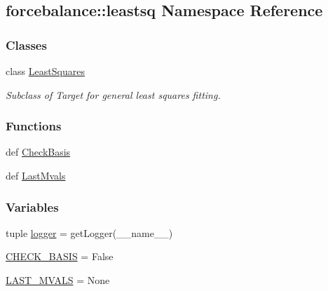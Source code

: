 \hypertarget{namespaceforcebalance_1_1leastsq}{\subsection{forcebalance\-:\-:leastsq \-Namespace \-Reference}
\label{namespaceforcebalance_1_1leastsq}
}
\subsubsection*{\-Classes}
\begin{DoxyCompactItemize}
\item 
class \hyperlink{classforcebalance_1_1leastsq_1_1LeastSquares}{\-Least\-Squares}
\begin{DoxyCompactList}\small\item\em \-Subclass of \-Target for general least squares fitting. \end{DoxyCompactList}\end{DoxyCompactItemize}
\subsubsection*{\-Functions}
\begin{DoxyCompactItemize}
\item 
def \hyperlink{namespaceforcebalance_1_1leastsq_a8e7ef329e27aff738bc91dd79bd2dd1c}{\-Check\-Basis}
\item 
def \hyperlink{namespaceforcebalance_1_1leastsq_ad9d0036b0003e0245608ffb192c7c60c}{\-Last\-Mvals}
\end{DoxyCompactItemize}
\subsubsection*{\-Variables}
\begin{DoxyCompactItemize}
\item 
tuple \hyperlink{namespaceforcebalance_1_1leastsq_a032a24b7852e456e95ed17a37c87f92c}{logger} = get\-Logger(\-\_\-\-\_\-name\-\_\-\-\_\-)
\item 
\hyperlink{namespaceforcebalance_1_1leastsq_a94dc97579736ea4d7f2bd2602d301456}{\-C\-H\-E\-C\-K\-\_\-\-B\-A\-S\-I\-S} = \-False
\item 
\hyperlink{namespaceforcebalance_1_1leastsq_ae598872a62bd2bdba5b69abf3b9524fe}{\-L\-A\-S\-T\-\_\-\-M\-V\-A\-L\-S} = \-None
\end{DoxyCompactItemize}


